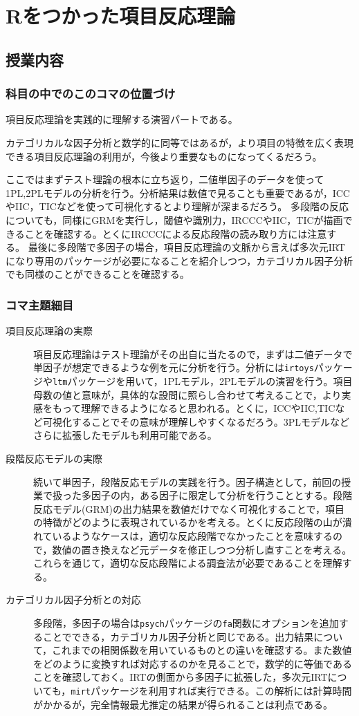\section{Rをつかった項目反応理論}
\subsection{授業内容}
\subsubsection{科目の中でのこのコマの位置づけ}
項目反応理論を実践的に理解する演習パートである。

カテゴリカルな因子分析と数学的に同等ではあるが，より項目の特徴を広く表現できる項目反応理論の利用が，今後より重要なものになってくるだろう。

ここではまずテスト理論の根本に立ち返り，二値単因子のデータを使って1PL,2PLモデルの分析を行う。分析結果は数値で見ることも重要であるが，ICCやIIC，TICなどを使って可視化するとより理解が深まるだろう。
多段階の反応についても，同様にGRMを実行し，閾値や識別力，IRCCCやIIC，TICが描画できることを確認する。とくにIRCCCによる反応段階の読み取り方には注意する。
最後に多段階で多因子の場合，項目反応理論の文脈から言えば多次元IRTになり専用のパッケージが必要になることを紹介しつつ，カテゴリカル因子分析でも同様のことができることを確認する。
\subsubsection{コマ主題細目}
\begin{description}
	\item[項目反応理論の実際]項目反応理論はテスト理論がその出自に当たるので，まずは二値データで単因子が想定できるような例を元に分析を行う。分析には\texttt{irtoys}パッケージや\texttt{ltm}パッケージを用いて，1PLモデル，2PLモデルの演習を行う。項目母数の値と意味が，具体的な設問に照らし合わせて考えることで，より実感をもって理解できるようになると思われる。とくに，ICCやIIC,TICなど可視化することでその意味が理解しやすくなるだろう。3PLモデルなどさらに拡張したモデルも利用可能である。

	\item[段階反応モデルの実際] 続いて単因子，段階反応モデルの実践を行う。因子構造として，前回の授業で扱った多因子の内，ある因子に限定して分析を行うこととする。段階反応モデル(GRM)の出力結果を数値だけでなく可視化することで，項目の特徴がどのように表現されているかを考える。とくに反応段階の山が潰れているようなケースは，適切な反応段階でなかったことを意味するので，数値の置き換えなど元データを修正しつつ分析し直すことを考える。これらを通じて，適切な反応段階による調査法が必要であることを理解する。

	\item[カテゴリカル因子分析との対応] 多段階，多因子の場合は\texttt{psych}パッケージの\texttt{fa}関数にオプションを追加することでできる，カテゴリカル因子分析と同じである。出力結果について，これまでの相関係数を用いているものとの違いを確認する。また数値をどのように変換すれば対応するのかを見ることで，数学的に等価であることを確認しておく。IRTの側面から多因子に拡張した，多次元IRTについても，\texttt{mirt}パッケージを利用すれば実行できる。この解析には計算時間がかかるが，完全情報最尤推定の結果が得られることは利点である。
\end{description}

